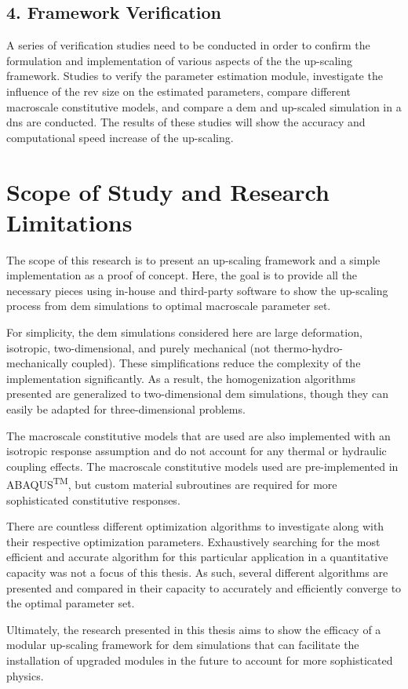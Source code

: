 \subsection*{4. Framework Verification}

A series of verification studies need to be conducted in order to confirm the formulation and implementation of various aspects of the the up-scaling framework. Studies to verify the parameter estimation module, investigate the influence of the \acrshort{rev} size on the estimated parameters, compare different macroscale constitutive models, and compare a \acrshort{dem} and up-scaled simulation in a \acrfull{dns} are conducted. The results of these studies will show the accuracy and computational speed increase of the up-scaling.

\section{Scope of Study and Research Limitations}

The scope of this research is to present an up-scaling framework and a simple implementation as a proof of concept. Here, the goal is to provide all the necessary pieces using in-house and third-party software to show the up-scaling process from \acrshort{dem} simulations to optimal macroscale parameter set. 

For simplicity, the \acrshort{dem} simulations considered here are large deformation, isotropic, two-dimensional, and purely mechanical (not thermo-hydro-mechanically coupled). These simplifications reduce the complexity of the implementation significantly. As a result, the homogenization algorithms presented are generalized to two-dimensional \acrshort{dem} simulations, though they can easily be adapted for three-dimensional problems.

The macroscale constitutive models that are used are also implemented with an isotropic response assumption and do not account for any thermal or hydraulic coupling effects. The macroscale constitutive models used are pre-implemented in ABAQUS\textsuperscript{TM}, but custom material subroutines are required for more sophisticated constitutive responses. 

There are countless different optimization algorithms to investigate along with their respective optimization parameters. Exhaustively searching for the most efficient and accurate algorithm for this particular application in a quantitative capacity was not a focus of this thesis. As such, several different algorithms are presented and compared in their capacity to accurately and efficiently converge to the optimal parameter set.

Ultimately, the research presented in this thesis aims to show the efficacy of a modular up-scaling framework for \acrshort{dem} simulations that can facilitate the installation of upgraded modules in the future to account for more sophisticated physics.
